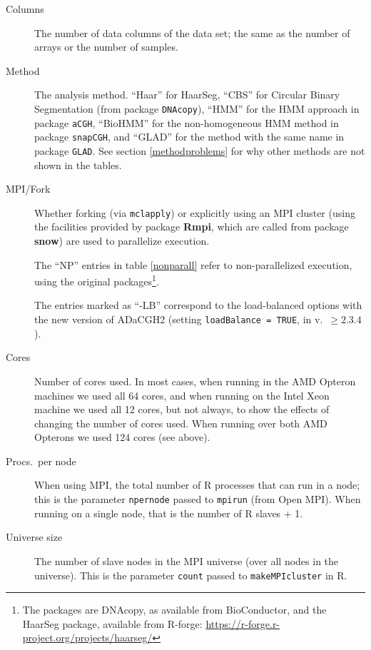 \documentclass[a4paper,11pt]{article}
\begin{document}
\begin{description}
  \item[Columns] The number of data columns of the data set; the same as
    the number of arrays or the number of samples.
  \item[Method] The analysis method. ``Haar'' for HaarSeg, ``CBS'' for
    Circular Binary Segmentation (from package \texttt{DNAcopy}), ``HMM''
    for the HMM approach in package \texttt{aCGH}, ``BioHMM'' for the
    non-homogeneous HMM method in package \texttt{snapCGH}, and ``GLAD''
    for the method with the same name in package \texttt{GLAD}. See 
    section \ref{methodproblems} for why other methods are not shown in
    the tables.


  \item[MPI/Fork] Whether forking (via \texttt{mclapply}) or explicitly
    using an MPI cluster (using the facilities provided by package
    \textbf{Rmpi}, which are called from package \textbf{snow}) are used
    to parallelize execution.

    The ``NP'' entries in table \ref{nonparall} refer to non-parallelized
    execution, using the original packages\footnote{The packages are
      DNAcopy, as available from BioConductor, and the HaarSeg package,
      available from R-forge:
      \url{https://r-forge.r-project.org/projects/haarseg/}}.

    The entries marked as ``-LB'' correspond to the load-balanced options
    with the new version of ADaCGH2 (setting \texttt{loadBalance = TRUE},
    in v.\ $\ge 2.3.4$).


  \item[Cores] Number of cores used. In most cases, when running in the
    AMD Opteron machines we used all 64 cores, and when running on the
    Intel Xeon machine we used all 12 cores, but not always, to show the
    effects of changing the number of cores used. When running over both
    AMD Opterons we used 124 cores (see above).

  \item[Procs.\ per node] When using MPI, the total number of R processes
    that can run in a node; this is the parameter \texttt{npernode} passed
    to \texttt{mpirun} (from Open MPI). When running on a single node,
    that is the number of R slaves + 1.

  \item[Universe size] The number of slave nodes in the MPI universe (over
    all nodes in the universe). This is the parameter \texttt{count}
    passed to \texttt{makeMPIcluster} in R.


\end{description}
\end{document}
